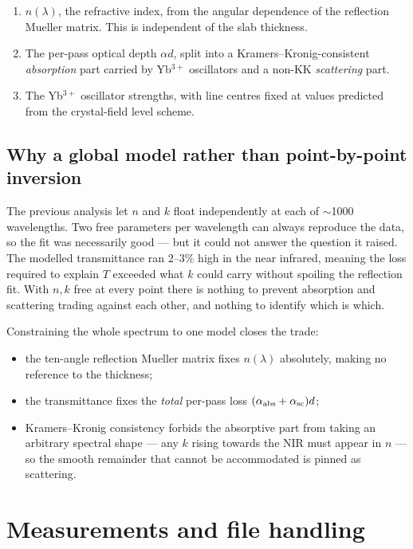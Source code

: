 \documentclass[11pt,a4paper]{article}
\newcommand{\ad}{\alpha d}
\newcommand{\lam}{\lambda}
\begin{document}
\begin{enumerate}
\item $n(\lam)$, the refractive index, from the angular dependence of the
      reflection Mueller matrix. This is independent of the slab thickness.
\item The per-pass optical depth $\ad$, split into a Kramers--Kronig-consistent
      \emph{absorption} part carried by Yb$^{3+}$ oscillators and a non-KK
      \emph{scattering} part.
\item The Yb$^{3+}$ oscillator strengths, with line centres fixed at values
      predicted from the crystal-field level scheme.
\end{enumerate}

\subsection{Why a global model rather than point-by-point inversion}

The previous analysis let $n$ and $k$ float independently at each of
$\sim$1000 wavelengths. Two free parameters per wavelength can always reproduce
the data, so the fit was necessarily good --- but it could not answer the
question it raised. The modelled transmittance ran $2$--$3\%$ high in the
near infrared, meaning the loss required to explain $T$ exceeded what $k$ could
carry without spoiling the reflection fit. With $n,k$ free at every point there
is nothing to prevent absorption and scattering trading against each other, and
nothing to identify which is which.

Constraining the whole spectrum to one model closes the trade:

\begin{itemize}
\item the ten-angle reflection Mueller matrix fixes $n(\lam)$ absolutely,
      making no reference to the thickness;
\item the transmittance fixes the \emph{total} per-pass loss
      $(\alpha_{\rm abs}+\alpha_{\rm sc})d$;
\item Kramers--Kronig consistency forbids the absorptive part from taking an
      arbitrary spectral shape --- any $k$ rising towards the NIR must appear in
      $n$ --- so the smooth remainder that cannot be accommodated is pinned as
      scattering.
\end{itemize}

\section{Measurements and file handling}
\end{document}
